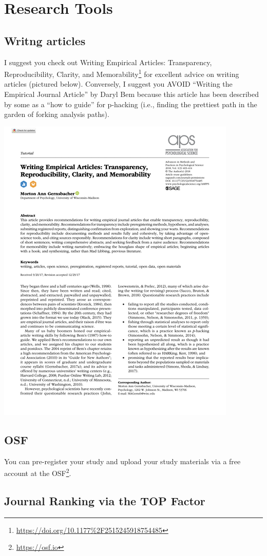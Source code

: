 \documentclass[
]{krantz}
\renewcommand{\href}[2]{#2\footnote{\url{#1}}}
\begin{document}
\hypertarget{research-tools}{%
\chapter{Research Tools}\label{research-tools}}

\hypertarget{writng-articles}{%
\section{Writng articles}\label{writng-articles}}

I suggest you check out \href{https://doi.org/10.1177\%2F2515245918754485}{Writing Empirical Articles: Transparency, Reproducibility, Clarity, and Memorability} for excellent advice on writing articles (pictured below). Conversely, I suggest you AVOID ``Writing the Empirical Journal Article'' by Daryl Bem because this article has been described by some as a ``how to guide'' for p-hacking (i.e., finding the prettiest path in the garden of forking analysis paths).

\includegraphics[width=0.5\linewidth]{images/gernsbacher}

\hypertarget{osf}{%
\section{OSF}\label{osf}}

You can pre-register your study and upload your study materials via a free account at the \href{https://osf.io}{OSF}.

\hypertarget{journal-ranking-via-the-top-factor}{%
\section{Journal Ranking via the TOP Factor}\label{journal-ranking-via-the-top-factor}}
\end{document}
